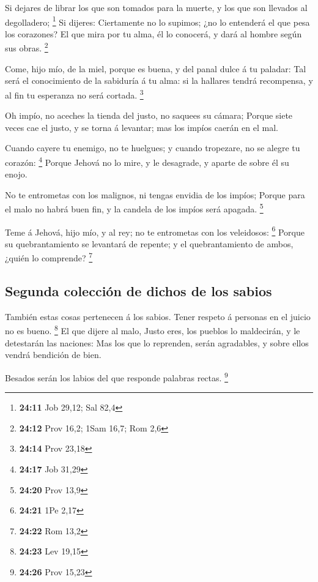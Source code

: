  Si dejares de librar los que son tomados para la muerte,
y los que son llevados al degolladero; \footnote{\textbf{24:11} Job
  29,12; Sal 82,4}  Si dijeres: Ciertamente no lo
supimos; ¿no lo entenderá el que pesa los corazones? El que mira por tu
alma, él lo conocerá, y dará al hombre según sus obras. \footnote{\textbf{24:12}
  Prov 16,2; 1Sam 16,7; Rom 2,6}

 Come, hijo mío, de la miel, porque es buena, y del panal
dulce á tu paladar:  Tal será el conocimiento de la
sabiduría á tu alma: si la hallares tendrá recompensa, y al fin tu
esperanza no será cortada. \footnote{\textbf{24:14} Prov 23,18}

 Oh impío, no aceches la tienda del justo, no saquees su
cámara;  Porque siete veces cae el justo, y se torna á
levantar; mas los impíos caerán en el mal.

 Cuando cayere tu enemigo, no te huelgues; y cuando
tropezare, no se alegre tu corazón: \footnote{\textbf{24:17} Job 31,29}
 Porque Jehová no lo mire, y le desagrade, y aparte de
sobre él su enojo.

 No te entrometas con los malignos, ni tengas envidia de
los impíos;  Porque para el malo no habrá buen fin, y la
candela de los impíos será apagada. \footnote{\textbf{24:20} Prov 13,9}

 Teme á Jehová, hijo mío, y al rey; no te entrometas con
los veleidosos: \footnote{\textbf{24:21} 1Pe 2,17} 
Porque su quebrantamiento se levantará de repente; y el quebrantamiento
de ambos, ¿quién lo comprende? \footnote{\textbf{24:22} Rom 13,2}

\hypertarget{segunda-colecciuxf3n-de-dichos-de-los-sabios}{%
\subsection{Segunda colección de dichos de los
sabios}\label{segunda-colecciuxf3n-de-dichos-de-los-sabios}}

 También estas cosas pertenecen á los sabios. Tener
respeto á personas en el juicio no es bueno. \footnote{\textbf{24:23}
  Lev 19,15}  El que dijere al malo, Justo eres, los
pueblos lo maldecirán, y le detestarán las naciones:  Mas
los que lo reprenden, serán agradables, y sobre ellos vendrá bendición
de bien.

 Besados serán los labios del que responde palabras
rectas. \footnote{\textbf{24:26} Prov 15,23}

